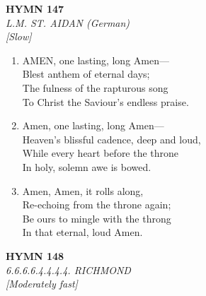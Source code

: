 \documentclass[11pt,a4paper]{article}
\begin{document}
\newpage
\begin{center}
    {\Large \textbf{HYMN 147}}
    \\
    \textit{L.M. ST. AIDAN (German)}
    \\
    \textit{\small [Slow]}
\end{center}
\vspace{1em}

\begin{enumerate}
    \item AMEN, one lasting, long Amen--- \\
        Blest anthem of eternal days; \\
        The fulness of the rapturous song \\
        To Christ the Saviour's endless praise.

    \item Amen, one lasting, long Amen--- \\
        Heaven's blissful cadence, deep and loud, \\
        While every heart before the throne \\
        In holy, solemn awe is bowed.

    \item Amen, Amen, it rolls along, \\
        Re-echoing from the throne again; \\
        Be ours to mingle with the throng \\
        In that eternal, loud Amen.

\end{enumerate}

\newpage
\begin{center}
    {\Large \textbf{HYMN 148}}
    \\
    \textit{6.6.6.6.4.4.4.4. RICHMOND}
    \\
    \textit{\small [Moderately fast]}
\end{center}
\vspace{1em}
\end{document}
